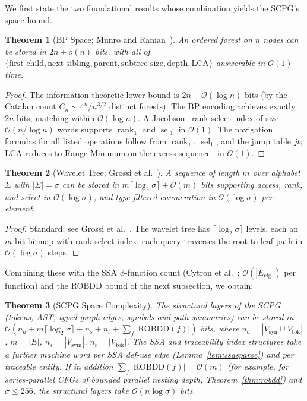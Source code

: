 \documentclass[journal,10pt,twoside]{IEEEtran}
\DeclareMathOperator{\rank}{rank}
\DeclareMathOperator{\sel}{sel}
\newtheorem{theorem}{Theorem}[section]
\newcommand{\VT}{V_{\!\mathrm{tok}}}
\newcommand{\VS}{V_{\!\mathrm{syn}}}
\newcommand{\VSYM}{V_{\!\mathrm{sym}}}
\newcommand{\ROBDD}{\mathrm{ROBDD}}
\newcommand{\BigO}{\mathcal{O}}
\begin{document}
We first state the two foundational results whose combination
yields the SCPG's space bound.

\begin{theorem}[BP Space; Munro and Raman~\cite{munroraman97}]
\label{thm:bp}
An ordered forest on $n$ nodes can be stored in
$2n + o(n)$ bits, with all of
$\{\mathrm{first\_child},\mathrm{next\_sibling},\mathrm{parent},
\mathrm{subtree\_size},\mathrm{depth},\mathrm{LCA}\}$
answerable in $\BigO(1)$ time.
\end{theorem}

\begin{proof}
The information-theoretic lower bound is $2n - \BigO(\log n)$
bits (by the Catalan count $C_n \sim 4^n / n^{3/2}$ distinct
forests).  The BP encoding achieves exactly $2n$ bits,
matching within $\BigO(\log n)$.  A Jacobson~\cite{jacobson89}
rank-select index of size $\BigO(n/\log n)$ words supports
$\rank_1$ and $\sel_1$ in $\BigO(1)$.  The navigation
formulas for all listed operations follow from
$\rank_1$, $\sel_1$, and the jump table $\mathit{jt}$;
LCA reduces to Range-Minimum on the excess
sequence~\cite{benderfarach00} in $\BigO(1)$.
\end{proof}

\begin{theorem}[Wavelet Tree; Grossi et al.~\cite{grossi03}]
\label{thm:wt}
A sequence of length $m$ over alphabet $\Sigma$ with
$|\Sigma| = \sigma$ can be stored in
$m\lceil\log_2\sigma\rceil + \BigO(m)$ bits supporting
access, rank, and select in $\BigO(\log\sigma)$, and
type-filtered enumeration in $\BigO(\log\sigma)$ per element.
\end{theorem}

\begin{proof}
Standard; see Grossi et al.~\cite{grossi03}.  The wavelet
tree has $\lceil\log_2\sigma\rceil$ levels, each an $m$-bit
bitmap with rank-select index; each query traverses the
root-to-leaf path in $\BigO(\log\sigma)$ steps.
\end{proof}

Combining these with the SSA $\phi$-function count
(Cytron et al.~\cite{cytron91}: $\BigO(|E_{\mathrm{cfg}}|)$
per function) and the ROBDD bound of the next subsection,
we obtain:

\begin{theorem}[SCPG Space Complexity]\label{thm:space}
The structural layers of the SCPG (tokens, AST, typed graph
edges, symbols and path summaries) can be stored in
$\BigO(n_a + m\lceil\log_2\sigma\rceil + n_s + n_t +
\textstyle\sum_f |\ROBDD(f)|)$ bits, where $n_a = |\VS \cup \VT|$,
$m = |E|$, $n_s = |\VSYM|$, $n_t = |\VT|$.  The SSA and
traceability index structures take a further machine word per
SSA def-use edge (Lemma~\ref{lem:ssasparse}) and per traceable
entity.  If in addition $\sum_f|\ROBDD(f)| = \BigO(m)$
(for example, for series-parallel CFGs of bounded parallel
nesting depth, Theorem~\ref{thm:robdd}) and $\sigma \le 256$,
the structural layers take $\BigO(n\log\sigma)$ bits.
\end{theorem}
\end{document}
